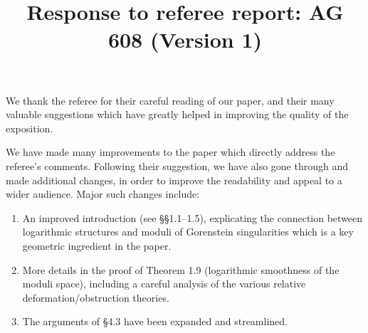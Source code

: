 \documentclass[11pt]{amsart}
\theoremstyle{plain}
\theoremstyle{remark}
\theoremstyle{definition}
\begin{document}
 
\title{Response to referee report: AG 608 (Version 1)}
\maketitle

\noindent We thank the referee for their careful reading of our paper, and their many valuable suggestions which have greatly helped in improving the quality of the exposition.

We have made many improvements to the paper which directly address the referee's comments. Following their suggestion, we have also gone through and made additional changes, in order to improve the readability and appeal to a wider audience. Major such changes include:
\begin{enumerate}
	\item An improved introduction (see \S\S 1.1--1.5), explicating the connection between logarithmic structures and moduli of Gorenstein singularities which is a key geometric ingredient in the paper.
	\item More details in the proof of Theorem 1.9 (logarithmic smoothness of the moduli space), including a careful analysis of the various relative deformation/obstruction theories.
	\item The arguments of \S 4.3 have been expanded and streamlined.
\end{enumerate}
\end{document}
